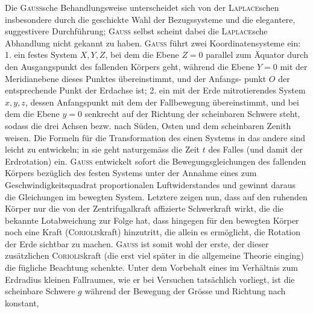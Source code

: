 \clearpage\begingroup{}
\makeatletter\tagsleft@true\let\veqno\@@leqno\makeatother
\renewcommand{\thefootnote}{\arabic{footnote})}\setcounter{footnote}{7}
\begin{center}\end{center}
\noindent\hspace*{\parindent}Die \textsc{Gauss}sche Behandlungsweise unterscheidet sich von der \textsc{Laplace}schen
insbesondere durch die geschickte Wahl der Bezugssysteme und die elegantere,
suggestivere Durchführung; \textsc{Gauss} selbst scheint dabei die \textsc{Laplace}sche Abhandlung
nicht gekannt zu haben. \textsc{Gauss} führt zwei Koordinatensysteme ein:
1. ein festes System $X,Y,Z$, bei dem die Ebene $Z=0$ parallel zum Äquator
durch den Ausgangspunkt des fallenden Körpers geht, während die Ebene
$Y=0$ mit der Meridianebene dieses Punktes übereinstimmt, und der Anfangs\nobreakdash-
\clearpage{}
\noindent punkt $O$ der entsprechende Punkt der Erdachse ist; 2. ein mit der Erde mitrotierendes
System $x,y,z$, dessen Anfangspunkt mit dem der Fallbewegung
übereinstimmt, und bei dem die Ebene $y=0$ senkrecht auf der Richtung der
scheinbaren Schwere steht, sodass die drei Achsen bezw. nach Süden, Osten
und dem scheinbaren Zenith weisen. Die Formeln für die Transformation
des einen Systems in das andere sind leicht zu entwickeln; in sie geht naturgemäss
die Zeit $t$ des Falles (und damit der Erdrotation) ein. \textsc{Gauss} entwickelt
sofort die Bewegungsgleichungen des fallenden Körpers bezüglich des festen
Systems unter der Annahme eines zum Geschwindigkeitsquadrat proportionalen
Luftwiderstandes und gewinnt daraus die Gleichungen im bewegten System.
Letztere zeigen nun, dass auf den ruhenden Körper nur die von der Zentrifugalkraft
affizierte Schwerkraft wirkt, die die bekannte Lotabweichung zur
Folge hat, dass hingegen für den bewegten Körper noch eine Kraft (\textsc{Coriolis}kraft)
hinzutritt, die allein es ermöglicht, die Rotation der Erde sichtbar
zu machen. \textsc{Gauss} ist somit wohl der erste, der dieser zusätzlichen \textsc{Coriolis}kraft
(die erst viel später in die allgemeine Theorie einging) die fügliche Beachtung
schenkte. Unter dem Vorbehalt eines im Verhältnis zum Erdradius
kleinen Fallraumes, wie er bei Versuchen tatsächlich vorliegt, ist die scheinbare
Schwere $g$ während der Bewegung der Grösse und Richtung nach konstant,

